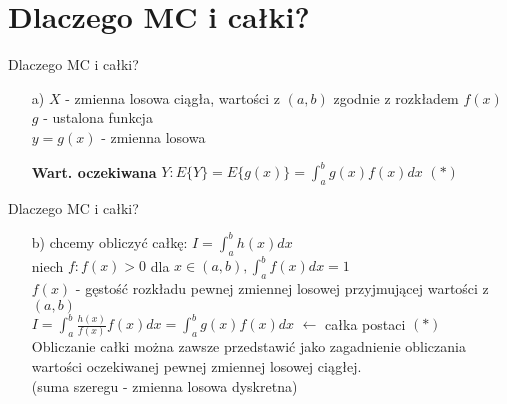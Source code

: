 \section{Dlaczego MC i całki?}
\begin{frame}{Dlaczego MC i całki?}
	\begin{enumerate}
		\item[a)]
        	$X$ - zmienna losowa ciągła, wartości z $(a, b)$ zgodnie z rozkładem $f(x)$ \\
            $g$ - ustalona funkcja \\
            $y = g(x)$ - zmienna losowa
            
            {\bf Wart. oczekiwana} $Y: E\{Y\} = E\{g(x)\} = \int_a^b g(x) f(x) dx$ \hfill $(*)$
	\end{enumerate}
\end{frame}
\begin{frame}{Dlaczego MC i całki?}
	\begin{enumerate}
		\item[b)]
			chcemy obliczyć całkę: $I = \int_a^b h(x) dx$ \\
            niech $f: f(x) > 0$ dla $x \in (a, b), \int_a^b f(x) dx = 1$ \\
            $f(x)$ - gęstość rozkładu pewnej zmiennej losowej przyjmującej wartości z $(a, b)$ \\
            $I = \int_a^b \frac{h(x)}{f(x)} f(x) dx = \int_a^b g(x)f(x)dx$ \hfill $\leftarrow$ całka postaci $(*)$ \\
            Obliczanie całki można zawsze przedstawić jako zagadnienie obliczania wartości oczekiwanej pewnej zmiennej losowej ciągłej.
            \\[8pt]
            (suma szeregu - zmienna losowa dyskretna)
	\end{enumerate}
\end{frame}